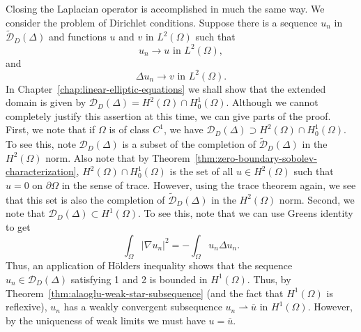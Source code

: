 \begin{Example}
\label{ex:laplacian-dirichlet-closure-partial-proof}
Closing the Laplacian operator is accomplished in much the same way. We consider the problem of Dirichlet conditions. Suppose there is a sequence $u_n$ in $\widetilde{\mathcal{D}}_D(\Delta)$ and functions $u$ and $v$ in $L^2(\Omega)$ such that
\begin{equation}\label{eq:laplacian-closure-function-convergence}
u_n\to u\text{ in }L^2(\Omega),
\end{equation}
and
\begin{equation}\label{eq:laplacian-closure-image-convergence}
\Delta u_n\to v\text{ in }L^2(\Omega).
\end{equation}
In Chapter~\ref{chap:linear-elliptic-equations} we shall show that the extended domain is given by $\mathcal{D}_D(\Delta)=H^2(\Omega)\cap H_0^1(\Omega)$. Although we cannot completely justify this assertion at this time, we can give parts of the proof. First, we note that if $\Omega$ is of class $C^1$, we have $\mathcal{D}_D(\Delta)\supset H^2(\Omega)\cap H_0^1(\Omega)$. To see this, note $\mathcal{D}_D(\Delta)$ is a subset of the completion of $\widetilde{\mathcal{D}}_D(\Delta)$ in the $H^2(\Omega)$ norm. Also note that by Theorem~\ref{thm:zero-boundary-sobolev-characterization}, $H^2(\Omega)\cap H_0^1(\Omega)$ is the set of all $u\in H^2(\Omega)$ such that $u=0$ on $\partial\Omega$ in the sense of trace. However, using the trace theorem again, we see that this set is also the completion of $\widetilde{\mathcal{D}}_D(\Delta)$ in the $H^2(\Omega)$ norm. Second, we note that $\mathcal{D}_D(\Delta)\subset H^1(\Omega)$. To see this, note that we can use Green\textquotesingle s identity to get
\begin{equation}\label{eq:laplacian-closure-green-energy-identity}
\int_\Omega|\nabla u_n|^2=-\int_\Omega u_n\Delta u_n.
\end{equation}
Thus, an application of Hölder\textquotesingle s inequality shows that the sequence $u_n\in\mathcal{D}_D(\Delta)$ satisfying 1 and 2 is bounded in $H^1(\Omega)$. Thus, by Theorem~\ref{thm:alaoglu-weak-star-subsequence} (and the fact that $H^1(\Omega)$ is reflexive), $u_n$ has a weakly convergent subsequence $u_n\rightharpoonup\overline u$ in $H^1(\Omega)$. However, by the uniqueness of weak limits we must have $u=\overline u$.
\end{Example}

